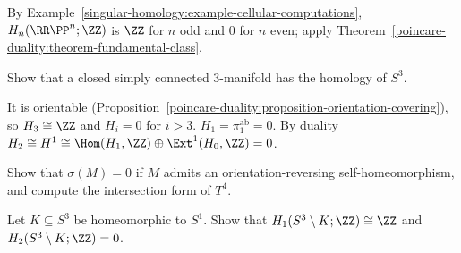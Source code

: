 \begin{solution}
By Example~\ref{singular-homology:example-cellular-computations}, $H_n(\RR\PP^n; \ZZ)$ is $\ZZ$ for $n$ odd and $0$ for $n$ even; apply
Theorem~\ref{poincare-duality:theorem-fundamental-class}.
\end{solution}

\begin{exercise}\label{poincare-duality:exercise-homology-sphere}
Show that a closed simply connected $3$-manifold has the homology of $S^3$.
\end{exercise}

\begin{solution}
It is orientable (Proposition~\ref{poincare-duality:proposition-orientation-covering}), so $H_3 \cong \ZZ$ and $H_i = 0$ for $i > 3$. $H_1 = \pi_1^{\mathrm{ab}} = 0$. By duality
$H_2 \cong H^1 \cong \Hom(H_1, \ZZ) \oplus \Ext^1(H_0, \ZZ) = 0$.
\end{solution}

\begin{exercise}\label{poincare-duality:exercise-signature-product}
Show that $\sigma(M) = 0$ if $M$ admits an orientation-reversing self-homeomorphism, and compute the intersection form of $T^4$.
\end{exercise}

\begin{exercise}\label{poincare-duality:exercise-knot-complement}
Let $K \subseteq S^3$ be homeomorphic to $S^1$. Show that $H_1(S^3 \setminus K; \ZZ) \cong \ZZ$ and $H_2(S^3 \setminus K; \ZZ) = 0$.
\end{exercise}
